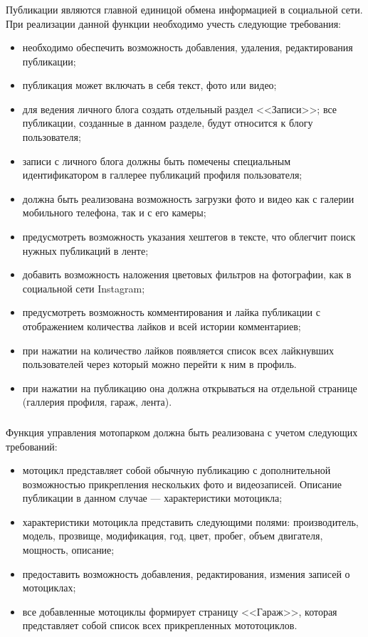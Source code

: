 \subsubsection{}
\label{sec:domain:specification:agenda}

Публикации являются главной единицой обмена информацией в социальной сети. При реализации данной функции необходимо учесть следующие требования:
\begin{itemize}
	\item необходимо обеспечить возможность добавления, удаления, редактирования публикации;
	\item публикация может включать в себя текст, фото или видео;
	\item для ведения личного блога создать отдельный раздел <<Записи>>; все публикации, созданные в данном разделе, будут относится к блогу пользователя;
	\item записи с личного блога должны быть помечены специальным идентификатором в галлерее публикаций профиля пользователя;
	\item должна быть реализована возможность загрузки фото и видео как с галерии мобильного телефона, так и с его камеры;
	\item предусмотреть возможность указания хештегов в тексте, что облегчит поиск нужных публикаций в ленте;
	\item добавить возможность наложения цветовых фильтров на фотографии, как в социальной сети Instagram;
	\item предусмотреть возможность комментирования и лайка публикации с отображением количества лайков и всей истории комментариев;
	\item при нажатии на количество лайков появляется список всех лайкнувших пользователей через который можно перейти к ним в профиль.
	\item при нажатии на публикацию она должна открываться на отдельной странице (галлерия профиля, гараж, лента).
\end{itemize}

\subsubsection{}
\label{sec:domain:specification:subjects}

Функция управления мотопарком должна быть реализована с учетом следующих требований:
\begin{itemize}
	\item мотоцикл представляет собой обычную публикацию с дополнительной возможностью прикрепления нескольких фото и видеозаписей. Описание публикации в данном случае --- характеристики мотоцикла;
	\item характеристики мотоцикла представить следующими полями: производитель, модель, прозвище, модификация, год, цвет, пробег, объем двигателя, мощность, описание;
	\item предоставить возможность добавления, редактирования, измения записей о мотоциклах;
	\item все добавленные мотоциклы формирует страницу <<Гараж>>, которая представляет собой список всех прикрепленных мототоциклов.
\end{itemize}

